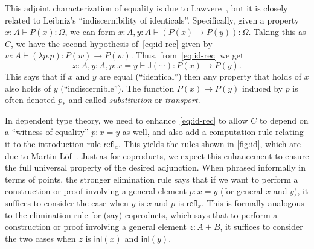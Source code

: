 \documentclass[12pt]{article}
\def\m#1{\llbracket#1\rrbracket}
\def\inl{\mathsf{inl}}
\def\refl{\mathsf{refl}}
\def\J{\mathsf{J}}
\def\types{\vdash}
\def\Id{\mathsf{Id}}
\numberwithin{equation}{section}
\begin{document}
This adjoint characterization of equality is due to Lawvere~\cite{lawvere:comprehension}, but it is closely related to Leibniz's ``indiscernibility of identicals''.
Specifically, given a property $x:A \types P(x):\Omega$, we can form $x:A, y:A \types (P(x)\to P(y)) :\Omega$.
Taking this as $C$, we have the second hypothesis of~\eqref{eq:id-rec} given by $w:A \types (\lambda p.p) : P(w) \to P(w)$.
Thus, from~\eqref{eq:id-rec} we get
\[x:A, y:A, p:x=y \types \J(\cdots) :  P(x) \to P(y).\]
This says that if $x$ and $y$ are equal (``identical'') then any property that holds of $x$ also holds of $y$ (``indiscernible'').
The function $P(x) \to P(y)$ induced by $p$ is often denoted $p_*$ and called \emph{substitution} or \emph{transport}.


In dependent type theory, we need to enhance~\eqref{eq:id-rec} to allow $C$ to depend on a ``witness of equality'' $p:x=y$ as well, and also add a computation rule relating it to the introduction rule $\refl_a$.
This yields the rules shown in \cref{fig:id}, which are due to Martin-L\"{o}f~\cite{martinlof:itt,martinlof:itt-pred}.
Just as for coproducts, we expect this enhancement to ensure the full universal property of the desired adjunction.
%
When phrased informally in terms of points, the stronger elimination rule says that if we want to perform a construction or proof involving a general element $p:x=y$ (for general $x$ and $y$), it suffices to consider the case when $y$ is $x$ and $p$ is $\refl_x$.
This is formally analogous to the elimination rule for (say) coproducts, which says that to perform a construction or proof involving a general element $z:A+B$, it suffices to consider the two cases when $z$ is $\inl(x)$ and $\inl(y)$.

\end{document}
